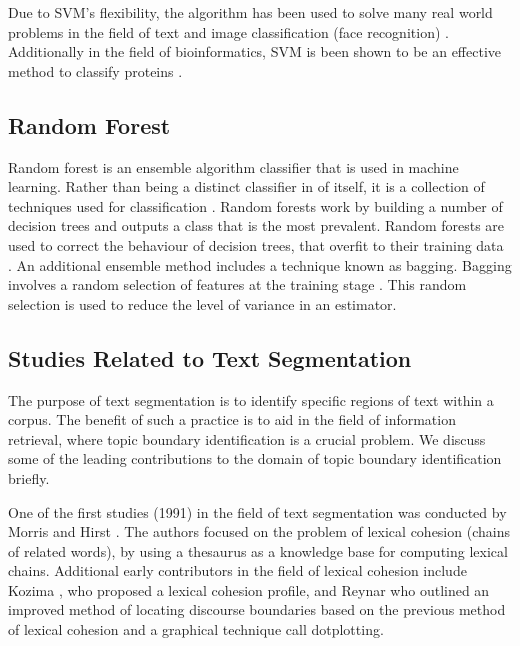 Due to SVM's flexibility, the algorithm has been used to solve many real world problems in the field of text and image classification (face recognition) \cite{osuna1997training}. Additionally in the field of bioinformatics, SVM is been shown to be an effective method to classify proteins \cite{liao2003combining}. 

\subsection{Random Forest}

Random forest is an ensemble algorithm classifier that is used in machine learning. Rather than being a distinct classifier in of itself, it is a collection of techniques used for classification \cite{ho1995random}. Random forests work by building a number of decision trees and outputs a class that is the most prevalent. Random forests are used to correct the behaviour of decision trees, that overfit to their training data \cite{friedman2001elements}. An additional ensemble method includes a technique known as bagging. Bagging involves a random selection of features at the training stage \cite{breiman1996bagging}. This random selection is used to reduce the level of variance in an estimator.




\subsection{Studies Related to Text Segmentation}

The purpose of text segmentation is to identify specific regions of text within a corpus. The benefit of such a practice is to aid in the field of information retrieval, where topic boundary identification is a crucial problem. We discuss some of the leading contributions to the domain of topic boundary identification briefly.

One of the first studies (1991) in the field of text segmentation was conducted by Morris and Hirst \cite{morris1991lexical}. The authors focused on the problem of lexical cohesion (chains of related words), by using a thesaurus as a knowledge base for computing lexical chains. Additional early contributors in the field of lexical cohesion include Kozima \cite{kozima1993text}, who proposed a lexical cohesion profile, and Reynar \cite{reynar1994automatic} who outlined an improved method of locating discourse boundaries based on the previous method of lexical cohesion and a graphical technique call dotplotting. 

